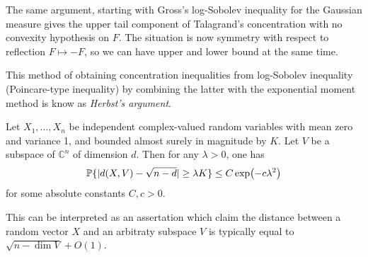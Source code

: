 The same argument, starting with Gross's log-Sobolev inequality for the Gaussian measure gives the upper tail component of Talagrand's concentration with no convexity hypothesis on $F$. The situation is now symmetry with respect to reflection $F\mapsto -F$, so we can have upper and lower bound at the same time.

This method of obtaining concentration inequalities from log-Sobolev inequality (Poincare-type inequality) by combining the latter with the exponential moment method is know as \textit{Herbst's argument}.

\begin{theorem}
    Let $X_1,\dots,X_n$ be independent complex-valued random variables with mean zero and variance 1, and bounded almost surely in magnitude by $K$. Let $V$ be a subspace of $\mathbb{C}^n$ of dimension $d$. Then for any $\lambda>0$, one has 
    \begin{equation*}
        \mathbb{P}\{|d(X,V)-\sqrt{n-d}|\geq \lambda K \} \leq C \exp(-c\lambda^2)
    \end{equation*}
    for some absolute constants $C,c>0$.
\end{theorem}

This can be interpreted as an assertation which claim the distance between a random vector $X$ and an arbitraty subspace $V$ is typically equal to $\sqrt{n-\dim V}+O(1)$.

